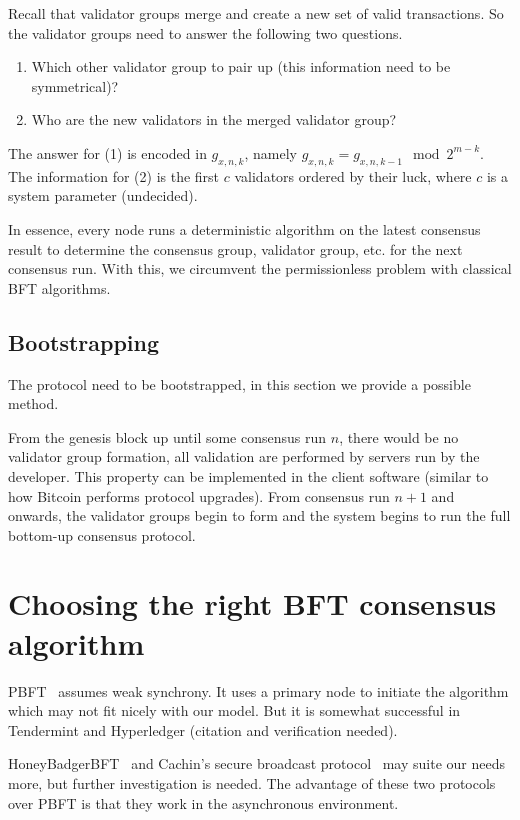 Recall that validator groups merge and create a new set of valid transactions.
So the validator groups need to answer the following two questions.
\begin{enumerate}
\item Which other validator group to pair up (this information need to be
  symmetrical)?
  \item Who are the new validators in the merged validator group?
\end{enumerate}
The answer for (1) is encoded in $g_{x,n,k}$, namely $g_{x,n,k} = g_{x,n,k-1}
\mod 2^{m-k}$. The information for (2) is the first $c$ validators ordered by
their luck, where $c$ is a system parameter (undecided).

In essence, every node runs a deterministic algorithm on the latest consensus
result to determine the consensus group, validator group, etc. for the next
consensus run. With this, we circumvent the permissionless problem with
classical BFT algorithms.

\subsection{Bootstrapping}\label{sec:bootstrapping}
The protocol need to be bootstrapped, in this section we provide a possible
method.

From the genesis block up until some consensus run $n$, there would be no
validator group formation, all validation are performed by servers run by the
developer. This property can be implemented in the client software (similar to
how Bitcoin performs protocol upgrades). From consensus run $n+1$ and onwards,
the validator groups begin to form and the system begins to run the full
bottom-up consensus protocol.

\section{Choosing the right BFT consensus algorithm}
PBFT~\cite{castro1999practical} assumes weak synchrony. It uses a primary node
to initiate the algorithm which may not fit nicely with our model. But it is
somewhat successful in Tendermint and Hyperledger (citation and verification
needed).

HoneyBadgerBFT~\cite{miller2016honey} and Cachin's secure broadcast
protocol~\cite{cachin2001secure} may suite our needs more, but further
investigation is needed. The advantage of these two protocols over PBFT is that
they work in the asynchronous environment.

